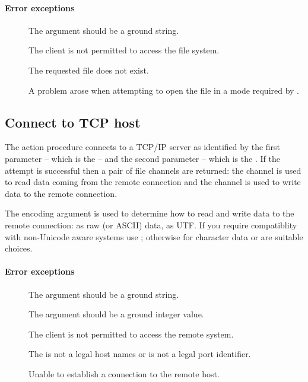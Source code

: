 \paragraph{Error exceptions}
\begin{description}
\item[]
The  argument should be a ground string.
\item[]
The client is not permitted to access the file system.
\item[]
The requested file does not exist.
\item[]
A problem arose when attempting to open the file in a mode required by \go.
\end{description}

\subsection{Connect to TCP host}
\label{io:tcpConnect}


The  action procedure connects to a TCP/IP server as identified by the first parameter -- which is the   -- and the second parameter -- which is the . If the attempt is successful then a pair of file channels are returned: the  channel is used to read data coming from the remote connection and the  channel is used to write data to the remote connection.

The encoding argument is used to determine how to read and write data to the remote connection: as raw (or ASCII) data, as UTF. If you require compatiblity with non-Unicode aware systems use ; otherwise for character data  or  are suitable choices.

\paragraph{Error exceptions}
\begin{description}
\item[]
The  argument should be a ground string.
\item[]
The  argument should be a ground integer value.
\item[]
The client is not permitted to access the remote system.
\item[]
The  is not a legal host names or  is not a legal port identifier.
\item[]
Unable to establish a connection to the remote host.
\end{description}

